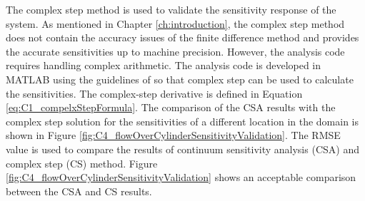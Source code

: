 The complex step method is used to validate the sensitivity response of the system. As mentioned in Chapter \ref{ch:introduction}, the complex step method does not contain the accuracy issues of the finite difference method and provides the accurate sensitivities up to machine precision. However, the analysis code requires handling complex arithmetic. The analysis code is developed in MATLAB using the guidelines of \cite{martins2003complex} so that complex step can be used to calculate the sensitivities. The complex-step derivative is defined in Equation \eqref{eq:C1_compelxStepFormula}. The comparison of the CSA results with the complex step solution for the sensitivities of a different location in the domain is shown in Figure \ref{fig:C4_flowOverCylinderSensitivityValidation}. The RMSE value is used to compare the results of continuum sensitivity analysis (CSA) and complex step (CS) method. Figure \ref{fig:C4_flowOverCylinderSensitivityValidation} shows an acceptable comparison between the CSA and CS results.
%

